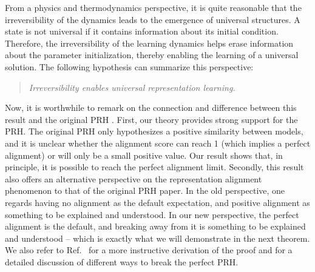 \documentclass{article}
\theoremstyle{plain}
\begin{document}
From a physics and thermodynamics perspective, it is quite reasonable that the irreversibility of the dynamics leads to the emergence of universal structures. A state is not universal if it contains information about its initial condition. Therefore, the irreversibility of the learning dynamics helps erase information about the parameter initialization, thereby enabling the learning of a universal solution. The following hypothesis can summarize this perspective:
\begin{quote}
    \centering \textit{Irreversibility enables universal representation learning.}
\end{quote}
Now, it is worthwhile to remark on the connection and difference between this result and the original PRH \cite{huh2024platonic}. First, our theory provides strong support for the PRH. The original PRH only hypothesizes a positive similarity between models, and it is unclear whether the alignment score can reach 1 (which implies a perfect alignment) or will only be a small positive value. Our result shows that, in principle, it is possible to reach the perfect alignment limit. Secondly, this result also offers an alternative perspective on the representation alignment phenomenon to that of the original PRH paper. In the old perspective, one regards having no alignment as the default expectation, and positive alignment as something to be explained and understood. In our new perspective, the perfect alignment is the default, and breaking away from it is something to be explained and understood -- which is exactly what we will demonstrate in the next theorem. We also refer to Ref.~\cite{ziyin2025proof} for a more instructive derivation of the proof and for a detailed discussion of different ways to break the perfect PRH.
\end{document}
